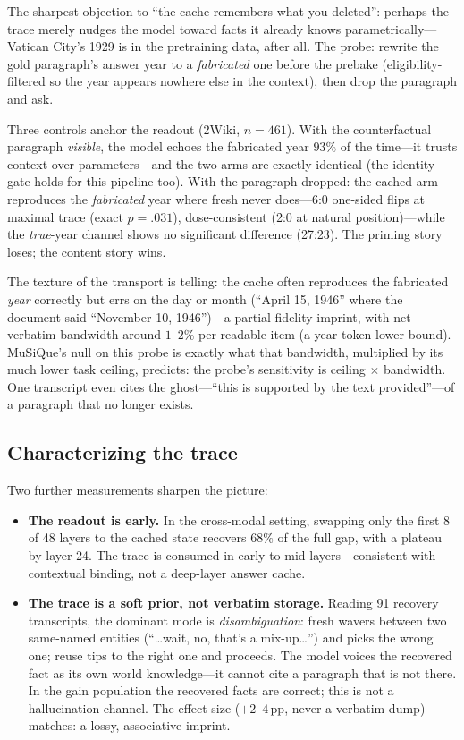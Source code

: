 \documentclass[11pt]{article}
\newcommand{\pp}{\,\mathrm{pp}}
\begin{document}
The sharpest objection to ``the cache remembers what you deleted'': perhaps the trace merely nudges the model toward facts it already knows parametrically---Vatican City's 1929 is in the pretraining data, after all. The probe: rewrite the gold paragraph's answer year to a \emph{fabricated} one before the prebake (eligibility-filtered so the year appears nowhere else in the context), then drop the paragraph and ask.

Three controls anchor the readout (2Wiki, $n=461$). With the counterfactual paragraph \emph{visible}, the model echoes the fabricated year $93\%$ of the time---it trusts context over parameters---and the two arms are exactly identical (the identity gate holds for this pipeline too). With the paragraph dropped: the cached arm reproduces the \emph{fabricated} year where fresh never does---6:0 one-sided flips at maximal trace (exact $p{=}.031$), dose-consistent (2:0 at natural position)---while the \emph{true}-year channel shows no significant difference (27:23). The priming story loses; the content story wins.

The texture of the transport is telling: the cache often reproduces the fabricated \emph{year} correctly but errs on the day or month (``April 15, 1946'' where the document said ``November 10, 1946'')---a partial-fidelity imprint, with net verbatim bandwidth around $1$--$2\%$ per readable item (a year-token lower bound). MuSiQue's null on this probe is exactly what that bandwidth, multiplied by its much lower task ceiling, predicts: the probe's sensitivity is ceiling $\times$ bandwidth. One transcript even cites the ghost---``this is supported by the text provided''---of a paragraph that no longer exists.

\subsection{Characterizing the trace}

Two further measurements sharpen the picture:

\begin{itemize}[leftmargin=2em]
\item \textbf{The readout is early.} In the cross-modal setting, swapping only the first 8 of 48 layers to the cached state recovers $68\%$ of the full gap, with a plateau by layer 24. The trace is consumed in early-to-mid layers---consistent with contextual binding, not a deep-layer answer cache.
\item \textbf{The trace is a soft prior, not verbatim storage.} Reading 91 recovery transcripts, the dominant mode is \emph{disambiguation}: fresh wavers between two same-named entities (``\ldots wait, no, that's a mix-up\ldots'') and picks the wrong one; reuse tips to the right one and proceeds. The model voices the recovered fact as its own world knowledge---it cannot cite a paragraph that is not there. In the gain population the recovered facts are correct; this is not a hallucination channel. The effect size ($+2$--$4\pp$, never a verbatim dump) matches: a lossy, associative imprint.
\end{itemize}
\end{document}
